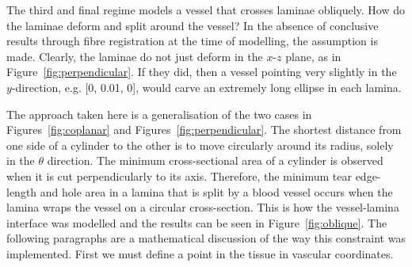   The third and final regime models a vessel that crosses laminae obliquely. How do the laminae deform and split around the vessel? In the absence of conclusive results through fibre registration at the time of modelling, the assumption is made. Clearly, the laminae do not just deform in the $x$-$z$ plane, as in Figure~\ref{fig:perpendicular}. If they did, then a vessel pointing very slightly in the $y$-direction, e.g. [0, 0.01, 0], would carve an extremely long ellipse in each lamina.
  
  The approach taken here is a generalisation of the two cases in Figures~\ref{fig:coplanar} and Figures~\ref{fig:perpendicular}. The shortest distance from one side of a cylinder to the other is to move circularly around its radius, solely in the $\theta$ direction. The minimum cross-sectional area of a cylinder is observed when it is cut perpendicularly to its axis. Therefore, the minimum tear edge-length and hole area in a lamina that is split by a blood vessel occurs when the lamina wraps the vessel on a circular cross-section. This is how the vessel-lamina interface was modelled and the results can be seen in Figure~\ref{fig:oblique}. The following paragraphs are a mathematical discussion of the way this constraint was implemented. First we must define a point in the tissue in vascular coordinates.
  
